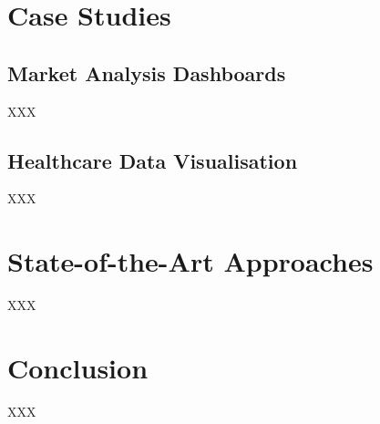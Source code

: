 \documentclass{article}\usepackage[]{graphicx}\usepackage[]{xcolor}
\begin{document}
\section{Case Studies}
\subsection{Market Analysis Dashboards}
XXX
\subsection{Healthcare Data Visualisation}
XXX




\section{State-of-the-Art Approaches}
XXX


\section{Conclusion}
XXX
\end{document}
